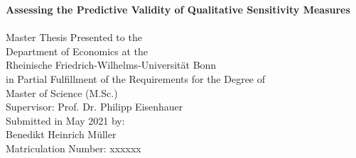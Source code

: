 \begin{titlepage}

    \begin{center}

    \vspace*{1.0cm}

    {\LARGE
    \bfseries Assessing the Predictive Validity of Qualitative Sensitivity Measures \\
    \vspace*{0.5cm}
    }\\


    {\large
    \vspace*{4.0cm}
    Master Thesis Presented to the\\
    \vspace*{0.25cm}
    Department of Economics at the\\
    \vspace*{0.25cm}
    Rheinische Friedrich-Wilhelms-Universität Bonn\\

    \vspace*{2.0cm}
    in Partial Fulfillment of the Requirements for the Degree of\\
    \vspace*{0.25cm}
    Master of Science (M.Sc.)\\

    \vspace*{4.0cm}
    Supervisor: Prof. Dr. Philipp Eisenhauer\\

    \vspace*{2.0cm}
    Submitted in May 2021 by:\\
    Benedikt Heinrich Müller\\
    Matriculation Number: xxxxxx
    }

    \end{center}

    \end{titlepage}